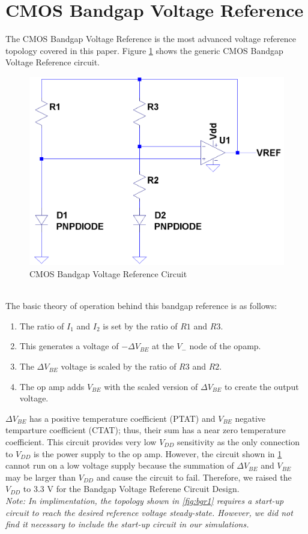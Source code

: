 \documentclass[conference]{IEEEtran}
\newcommand{\tab}{\hspace*{2em}}
\begin{document}
\section{CMOS Bandgap Voltage Reference}
The CMOS Bandgap Voltage Reference is the most advanced voltage reference topology covered in this paper.  Figure \ref{fig:bgr-1} shows the generic CMOS Bandgap Voltage Reference circuit.
\begin{figure}[!htbp]
  	\centering
  	\includegraphics[scale=0.25]{images/bgr-1.png}
  	\caption[bgr-1]{CMOS Bandgap Voltage Reference Circuit}
  	\label{fig:bgr-1}
	\end{figure}\\
The basic theory of operation behind this bandgap reference is as follows:
\begin{enumerate}
	\item The ratio of $I_1$ and $I_2$ is set by the ratio of $R1$ and $R3$.
	\item This generates a voltage of $-\Delta V_{BE}$ at the $V_-$ node of the opamp.
	\item The $\Delta V_{BE}$ voltage is scaled by the ratio of $R3$ and $R2$.
	\item The op amp adds $V_{BE}$ with the scaled version of $\Delta V_{BE}$ to create the output voltage.
\end{enumerate}
$\Delta V_{BE}$ has a positive temperature coefficient (PTAT) and $V_{BE}$ negative temparture coefficient (CTAT); thus, their sum has a near zero temperature coefficient.  This circuit provides very low $V_{DD}$ sensitivity as the only connection to $V_{DD}$ is the power supply to the op amp.  However, the circuit shown in \ref{fig:bgr-1} cannot run on a low voltage supply because the summation of $\Delta V_{BE}$ and $V_{BE}$ may be larger than $V_{DD}$ and cause the circuit to fail.  Therefore, we raised the $V_{DD}$ to 3.3 V for the Bandgap Voltage Referene Circuit Design.\\\tab
\emph{Note: In implimentation, the topology shown in \ref{fig:bgr1} requires a start-up circuit to reach the desired reference voltage steady-state.  However, we did not find it necessary to include the start-up circuit in our simulations.}
\end{document}
